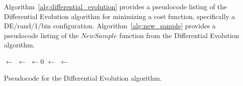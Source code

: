 Algorithm~\ref{alg:differential_evolution} provides a pseudocode listing of the Differential Evolution algorithm for minimizing a cost function, specifically a DE/rand/1/bin configuration. Algorithm~\ref{alg:new_sample} provides a pseudocode listing of the $NewSample$ function from the Differential Evolution algorithm.

\begin{algorithm}[htp]
	\SetLine  

	
  
	\KwIn{\PopulationSize, \NumParameters, \WeightingFactor, \CrossoverRate}		
	\KwOut{\Best}
	\Population $\leftarrow$ \InitializePopulation{\PopulationSize, \NumParameters}\;
	\EvaluateCost{\Population}\;
	\Best $\leftarrow$ \GetBestSolution{\Population}\;
	\While{$\neg$\StopCondition{}} {
		\NewPopulation $\leftarrow 0$\;
		\ForEach{\Member $\in$ \Population}{
			\Sample $\leftarrow$ \NewSample{\Member, \Population, \NumParameters, \WeightingFactor, \CrossoverRate}\;
			\eIf{\Cost{\Sample} $\leq$ \Cost{\Member}}{
				\NewPopulation $\leftarrow$ \Sample\;
			}
			{
				\NewPopulation $\leftarrow$ \Member\;
			}
		}
		\Population $\leftarrow$ \NewPopulation\;
		\EvaluateCost{\Population}\;
		\Best $\leftarrow$ \GetBestSolution{\Population}\;
	}
	\Return{\Best}\;
	\caption{Pseudocode for the Differential Evolution algorithm.}
	\label{alg:differential_evolution}
\end{algorithm}


